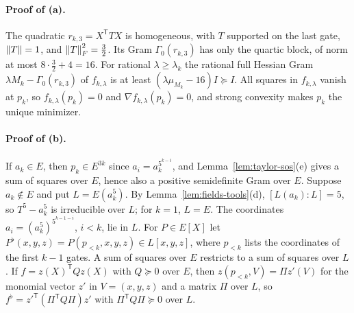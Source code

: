\paragraph{Proof of (a).}
The quadratic $r_{k,3}=X^{\mathsf T}TX$ is homogeneous, with $T$ supported on
the last gate, $\left\lVert T\right\rVert=1$, and $\left\lVert T\right\rVert_F^2=\frac32$. Its Gram
$\Gamma_0(r_{k,3})$ has only the quartic block, of norm at most
$8\cdot\frac32+4=16$. For rational $\lambda\ge\lambda_k$ the rational full
Hessian Gram $\lambda M_k-\Gamma_0(r_{k,3})$ of $f_{k,\lambda}$ is at least
$(\lambda\mu_{M_k}-16)I\succeq I$. All squares in $f_{k,\lambda}$ vanish at
$p_k$, so $f_{k,\lambda}(p_k)=0$ and $\nabla f_{k,\lambda}(p_k)=0$, and
strong convexity makes $p_k$ the unique minimizer.

\paragraph{Proof of (b).}
If $a_k\in E$, then $p_k\in E^{3k}$ since $a_i=a_k^{5^{k-i}}$, and
Lemma~\ref{lem:taylor-sos}(e) gives a sum of squares over $E$, hence also a
positive semidefinite Gram over $E$. Suppose $a_k\notin E$ and put
$L=E(a_k^5)$. By Lemma~\ref{lem:fields-tools}(d), $[L(a_k):L]=5$, so
$T^5-a_k^5$ is irreducible over $L$; for $k=1$, $L=E$. The coordinates
$a_i=(a_k^5)^{5^{k-1-i}}$, $i<k$, lie in $L$. For $P\in E[X]$ let
$P^\flat(x,y,z)=P(p_{<k},x,y,z)\in L[x,y,z]$, where $p_{<k}$ lists the
coordinates of the first $k-1$ gates. A sum of squares over $E$ restricts to a
sum of squares over $L$. If $f=z(X)^{\mathsf T}Qz(X)$ with $Q\succeq0$ over $E$,
then $z(p_{<k},V)=\Pi z'(V)$ for the monomial vector $z'$ in
$V=(x,y,z)$ and a matrix $\Pi$ over $L$, so
$f^\flat=z'^{\mathsf T}(\Pi^{\mathsf T}Q\Pi)z'$ with
$\Pi^{\mathsf T}Q\Pi\succeq0$ over $L$.

